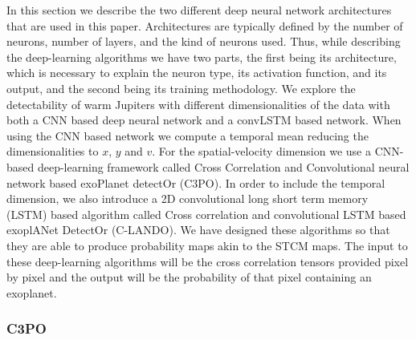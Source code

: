 \documentclass{aa}
\begin{document}
In this section we describe the two different deep neural network architectures that are used in this paper.
Architectures are typically defined by the number of neurons, number of layers, and the kind of neurons used.
Thus, while describing the deep-learning algorithms we have two parts, the first being its architecture, which is necessary to explain the neuron type, its activation function, and its output, and the second being its training methodology.
We explore the detectability of warm Jupiters with different dimensionalities of the data with both a CNN based deep neural network and a convLSTM based network.
When using the CNN based network we compute a temporal mean reducing the dimensionalities to $x$, $y$ and $v$.
For the spatial-velocity dimension we use a CNN-based deep-learning framework called Cross Correlation and Convolutional neural network based exoPlanet detectOr (C3PO).
In order to include the temporal dimension, we also introduce a 2D convolutional long short term memory (LSTM) based algorithm called Cross correlation and convolutional LSTM based exoplANet DetectOr (C-LANDO).
We have designed these algorithms so that they are able to produce probability maps akin to the STCM maps. 
The input to these deep-learning algorithms will be the cross correlation tensors provided pixel by pixel and the output will be the probability of that pixel containing an exoplanet. %

\subsubsection{C3PO}
\end{document}
